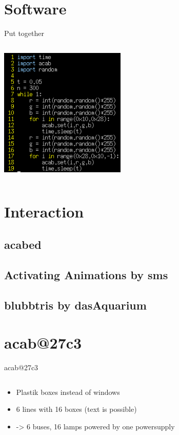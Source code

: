 \documentclass{beamer}
\begin{document}
\section{Software}
\begin{frame}{Put together}
  \begin{columns}
    \begin{column}{9cm}
      \includegraphics[width=6cm, clip, trim= 0 0 0 0]{bilder/fill.png}
    \end{column}
  \end{columns}
\end{frame}
\section{Interaction}
    \subsection{acabed}
    \subsection{Activating Animations by sms}
    \subsection{blubbtris by dasAquarium}
\section{acab@27c3}
  \begin{frame}{acab@27c3}
    \begin{columns}
      \begin{column}{9cm}
            \begin{itemize}
               \item Plastik boxes instead of windows
               \item 6 lines with 16 boxes (text is possible)
               \item -> 6 buses, 16 lamps powered by one powersupply
               \end{itemize}
      \end{column}
   \end{columns}
  \end{frame}
\end{document}
